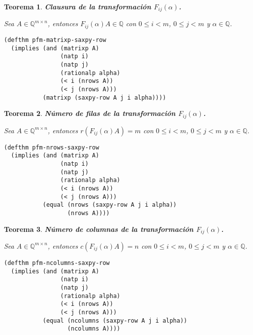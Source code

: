 \documentclass[a4paper,10pt]{article}
\newcommand{\Q}[1]{#1 \in \mathbb{Q}}
\newcommand{\M}[3]{#1 \in \mathbb{Q}^{#2 \times #3}}
\newtheorem{teor}{{Teorema}}
\begin{document}
\par \vspace{16pt}

\begin{teor} \textbf{Clausura de la transformación $F_{ij}(\alpha)$.}\vspace{8pt}\par
Sea $\M{A}{m}{n}$, entonces $\Q{F_{ij}(\alpha)A}$ con $0 \leq i < m$, $0 \leq j < m$ y $\Q{\alpha}$.
\end{teor}

\begin{lstlisting}[language=clips]
(defthm pfm-matrixp-saxpy-row
  (implies (and (matrixp A)
                (natp i)
                (natp j)
                (rationalp alpha)
                (< i (nrows A))
                (< j (nrows A)))
           (matrixp (saxpy-row A j i alpha))))
\end{lstlisting}

\par \vspace{16pt}

\begin{teor} \textbf{Número de filas de la transformación $F_{ij}(\alpha)$.}\vspace{8pt}\par
Sea $\M{A}{m}{n}$, entonces $r(F_{ij}(\alpha)A) = m$ con $0 \leq i < m$, $0 \leq j < m$ y $\Q{\alpha}$.
\end{teor}

\begin{lstlisting}[language=clips]
(defthm pfm-nrows-saxpy-row
  (implies (and (matrixp A)
                (natp i)
                (natp j)
                (rationalp alpha)
                (< i (nrows A))
                (< j (nrows A)))
           (equal (nrows (saxpy-row A j i alpha)) 
                  (nrows A))))
\end{lstlisting}

\par \vspace{16pt}

\begin{teor} \textbf{Número de columnas de la transformación $F_{ij}(\alpha)$.}\vspace{8pt}\par
Sea $\M{A}{m}{n}$, entonces $c(F_{ij}(\alpha)A) = n$ con $0 \leq i < m$, $0 \leq j < m$ y $\Q{\alpha}$.
\end{teor}

\begin{lstlisting}[language=clips]
(defthm pfm-ncolumns-saxpy-row
  (implies (and (matrixp A)
                (natp i)
                (natp j)
                (rationalp alpha)
                (< i (nrows A))
                (< j (nrows A)))
           (equal (ncolumns (saxpy-row A j i alpha)) 
                  (ncolumns A))))
\end{lstlisting}
\end{document}
